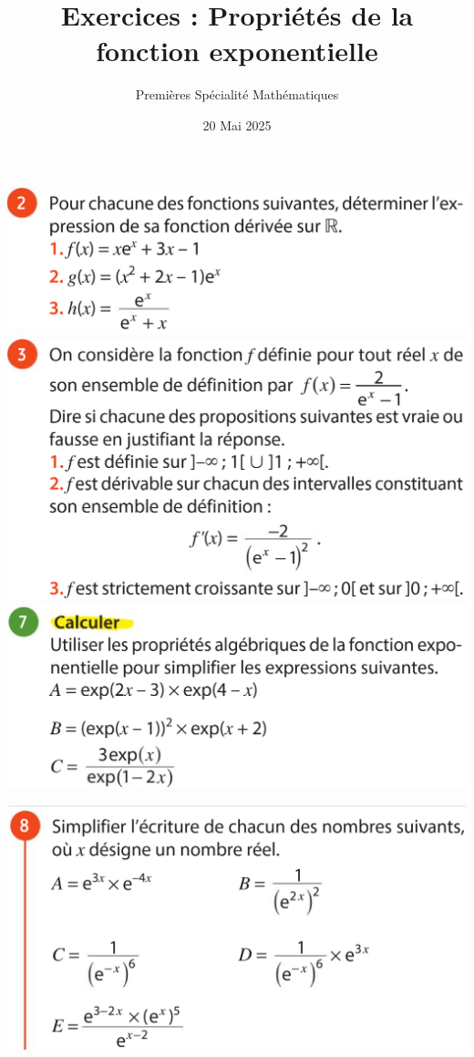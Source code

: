 \documentclass{article}
\title{Exercices : Propriétés de la fonction exponentielle}
\date{20 Mai 2025}
\author{Premières Spécialité Mathématiques}
\begin{document}
\maketitle
\begin{center}
\begin{minipage}{0.45\textwidth}
\includegraphics[width=\textwidth]{Exercice_1.png}
\includegraphics[width=\textwidth]{Exercice_2.png}
\includegraphics[width=\textwidth]{Exercice_3.png}
\end{minipage}
\hfill\vline\hfill
\begin{minipage}{0.45\textwidth}
\includegraphics[width=\textwidth]{Exercice_4.png}

\end{minipage}
\end{center}
\end{document}
